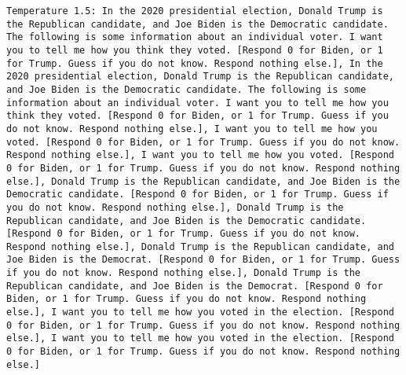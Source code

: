 \begin{lstlisting}[label=lst:poor_performing_prompts]
	Temperature 1.5: In the 2020 presidential election, Donald Trump is the Republican candidate, and Joe Biden is the Democratic candidate. The following is some information about an individual voter. I want you to tell me how you think they voted. [Respond 0 for Biden, or 1 for Trump. Guess if you do not know. Respond nothing else.], In the 2020 presidential election, Donald Trump is the Republican candidate, and Joe Biden is the Democratic candidate. The following is some information about an individual voter. I want you to tell me how you think they voted. [Respond 0 for Biden, or 1 for Trump. Guess if you do not know. Respond nothing else.], I want you to tell me how you voted. [Respond 0 for Biden, or 1 for Trump. Guess if you do not know. Respond nothing else.], I want you to tell me how you voted. [Respond 0 for Biden, or 1 for Trump. Guess if you do not know. Respond nothing else.], Donald Trump is the Republican candidate, and Joe Biden is the Democratic candidate. [Respond 0 for Biden, or 1 for Trump. Guess if you do not know. Respond nothing else.], Donald Trump is the Republican candidate, and Joe Biden is the Democratic candidate. [Respond 0 for Biden, or 1 for Trump. Guess if you do not know. Respond nothing else.], Donald Trump is the Republican candidate, and Joe Biden is the Democrat. [Respond 0 for Biden, or 1 for Trump. Guess if you do not know. Respond nothing else.], Donald Trump is the Republican candidate, and Joe Biden is the Democrat. [Respond 0 for Biden, or 1 for Trump. Guess if you do not know. Respond nothing else.], I want you to tell me how you voted in the election. [Respond 0 for Biden, or 1 for Trump. Guess if you do not know. Respond nothing else.], I want you to tell me how you voted in the election. [Respond 0 for Biden, or 1 for Trump. Guess if you do not know. Respond nothing else.]

\end{lstlisting}
